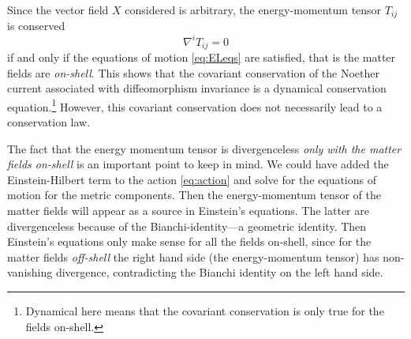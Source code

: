 \documentclass[11pt]{article}
\begin{document}
Since the vector field $X$ considered is arbitrary, the 
energy-momentum tensor $T_{ij}$ is conserved
%
\begin{equation}
	\nabla^i T_{ij} = 0
\end{equation}
if and only if the equations of motion \eqref{eq:ELeqs} are 
satisfied, that is the matter fields are \emph{on-shell}. This 
shows that the covariant conservation of the Noether current 
associated with diffeomorphism invariance is a dynamical 
conservation equation.\footnote{Dynamical here means that the 
	covariant conservation is only true for the fields on-shell.}
However, this covariant conservation does not necessarily lead to 
a conservation law.

The fact that the energy momentum tensor is divergenceless 
\emph{only with the matter fields on-shell} is an important point 
to keep in mind. We could have added the Einstein-Hilbert term to 
the action \eqref{eq:action} and solve for the equations of 
motion for the metric components. Then the energy-momentum tensor 
of the matter fields will appear as a source in Einstein's 
equations. The latter are divergenceless because of the 
Bianchi-identity---a geometric identity. Then Einstein's 
equations only make sense for all the fields on-shell, since for 
the matter fields \emph{off-shell} the right hand side (the 
energy-momentum tensor) has non-vanishing divergence, 
contradicting the Bianchi identity on the left hand side.
\end{document}
